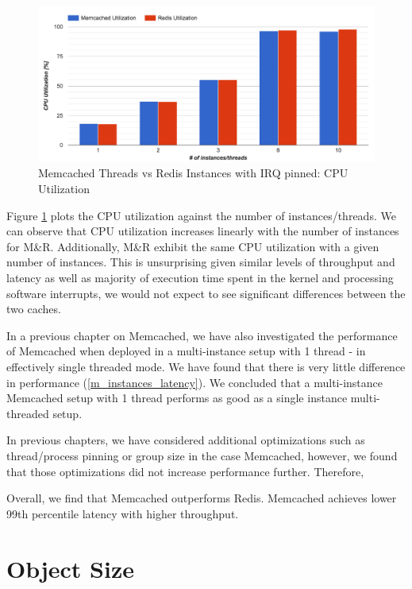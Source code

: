 \begin{figure}[h]
    \includegraphics[width=\textwidth]{./res2/mr_irq_cpu.png}
    \caption{Memcached Threads vs Redis Instances with IRQ pinned: CPU Utilization}
    \label{fig:mr_irq_cpu}
\end{figure}

Figure \ref{fig:mr_irq_cpu} plots the CPU utilization against the number of instances/threads. We can observe that CPU utilization increases linearly with the number of instances for M\&R. Additionally, M\&R exhibit the same CPU utilization with a given number of instances. This is unsurprising given similar levels of throughput and latency as well as majority of execution time spent in the kernel and processing software interrupts, we would not expect to see significant differences between the two caches.

In a previous chapter on Memcached, we have also investigated the performance of Memcached when deployed in a multi-instance setup with 1 thread - in effectively single threaded mode. We have found that there is very little difference in performance (\ref{m_instances_latency}). We concluded that a multi-instance Memcached setup with 1 thread performs as good as a single instance multi-threaded setup.

In previous chapters, we have considered additional optimizations such as thread/process pinning or group size in the case Memcached, however, we found that those optimizations did not increase performance further. Therefore,

Overall, we find that Memcached outperforms Redis. Memcached achieves lower 99th percentile latency with higher throughput.

\section{Object Size}

